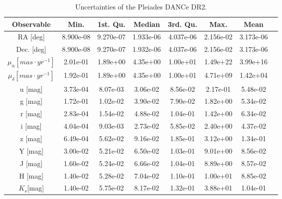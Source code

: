 \begin{table}[ht!]
\caption{Uncertainties of the Pleiades DANCe DR2.}
\begin{center}
\begin{tabular}{|c|c|c|c|c|c|c|c|}
\hline
Observable & Min. & 1st. Qu. & Median & 3rd. Qu. & Max. &Mean\\
\hline
\hline
RA [deg]&8.900e-08 &9.270e-07&1.933e-06&4.037e-06&2.156e-02&3.173e-06\\
Dec. [deg] &8.900e-08&9.270e-07&1.932e-06&4.037e-06&2.156e-02&3.173e-06\\
$\mu_{\alpha} [mas\cdot yr^{-1}]$&2.01e-01 &1.89e+00& 4.35e+00& 1.00e+01& 1.49e+22&3.99e+16\\ 
$\mu_{\delta} [mas\cdot yr^{-1}]$&1.92e-01 &1.89e+00 &4.35e+00 &1.00e+01 & 4.71e+09&1.42e+04\\
u [mag] &3.73e-04& 8.07e-03& 3.06e-02& 8.56e-02& 2.17e-01&5.48e-02\\
g [mag] &1.72e-01 & 1.02e-02&  3.90e-02 & 7.90e-02 & 1.82e+00&5.34e-02\\
r [mag] & 2.83e-04 & 1.54e-02& 4.88e-02 &1.04e-01& 1.42e+00&6.34e-02\\
i [mag] & 4.04e-04 & 9.03e-03&  2.73e-02& 5.85e-02& 2.40e+00&4.37e-02\\
z [mag] & 6.49e-04& 5.62e-02& 9.16e-02& 1.85e-01& 3.12e+00&1.34e-01\\
Y [mag] & 3.00e-02& 5.21e-02& 6.50e-02& 1.03e-01& 9.01e+00&8.56e-02\\
J [mag] & 1.60e-02& 5.24e-02& 6.66e-02& 1.04e-01& 8.89e+00&8.57e-02\\
H [mag] & 1.40e-02& 5.28e-02& 7.04e-02& 1.10e-01& 1.00e+01&8.85e-02\\
$K_s$[mag]&1.40e-02& 5.75e-02& 8.17e-02& 1.32e-01& 3.88e+01&1.04e-01\\
\hline
\end{tabular}
\end{center}
\label{tab:DR2uncertainties}
\end{table}%

